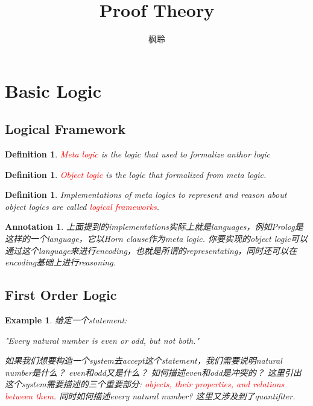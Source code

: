 \documentclass{article}
\theoremstyle{plain}
\newtheorem{example}[theorem]{Example}
\newtheorem{definition}[theorem]{Definition}
\newtheorem{annotation}[theorem]{Annotation}
\theoremstyle{nonumberplain}
\newcommand{\redt}[1]{\textcolor{red}{#1}}
\begin{document}
\title{Proof Theory}
\author{枫聆}
\maketitle
\tableofcontents


\newpage
\section{Basic Logic}

\subsection{Logical Framework}


\begin{definition}
\rm \redt{Meta logic} is the logic that used to formalize anthor logic
\end{definition}

\begin{definition}
\rm \redt{Object logic} is the logic that formalized from meta logic.  
\end{definition}

\begin{definition}
\rm Implementations of meta logics to represent and reason about  object logics are called \redt{logical frameworks}.
\end{definition}

\begin{annotation}
\rm 上面提到的implementations实际上就是languages，例如Prolog是这样的一个language，它以Horn clause作为meta logic. 你要实现的object logic可以通过这个language来进行encoding，也就是所谓的representating，同时还可以在encoding基础上进行reasoning.  
\end{annotation}

\newpage
\subsection{First Order Logic}

\begin{example}
\rm 给定一个statement:

"Every natural number is even or odd, but not both."

如果我们想要构造一个system去accept这个statement，我们需要说明natural number是什么？ even和odd又是什么？ 如何描述even和odd是冲突的？ 这里引出这个system需要描述的三个重要部分: \redt{objects, their properties, and relations between them}. 同时如何描述every natural number? 这里又涉及到了quantifiter.  
\end{example}
\end{document}
